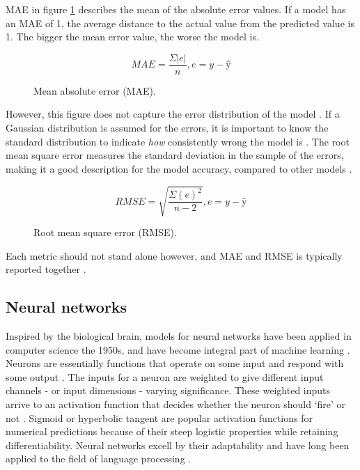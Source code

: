 \documentclass[a4paper]{article}
\begin{document}
MAE in figure \ref{fig:mae} describes the mean of the absolute error values.
If a model has an MAE of 1, the average distance to the actual value from the
predicted value is 1. The bigger the mean error value, the worse the model is.

\begin{figure}
\[MAE = \frac{\Sigma |e|}{n}, e = y - ŷ\]
\caption{Mean absolute error (MAE).}
\label{fig:mae}
\end{figure}

However, this figure does not capture the error distribution of the model
\citep{Chai2014}. If
a Gaussian distribution is assumed for the errors, it is important to know
the standard distribution to indicate \textit{how} consistently wrong the model
is \citep{Agresti2008}. The root mean square error measures the standard
deviation in the sample of the errors, making it a good description for the
model accuracy, compared to other models \citep{Agresti2008, Chai2014}.

\begin{figure}
\[ RMSE = \sqrt{\frac{\Sigma (e)^{2}}{n - 2}}, e = y - ŷ \]
\caption{Root mean square error (RMSE).}
\label{fig:rmse}
\end{figure}

Each metric should not stand alone however, and MAE and RMSE is typically
reported together \citep{Chai2014}.

\subsection{Neural networks}
Inspired by the biological brain, models for neural networks have been applied
in computer science the 1950s, and have become integral part of machine learning
 \citep{NILSSON2009, Russell2009}.
Neurons are essentially functions that operate on some input and respond with
some output \citep{Russell2009}. The inputs for a neuron are weighted to give
different input channels - or input dimensions - varying significance. These
weighted inputs arrive to an activation function that decides whether the
neuron should ‘fire’ or not \citep{NILSSON2009}. Sigmoid or hyperbolic tangent
are popular
activation functions for numerical predictions because of their steep logistic
properties while retaining differentiability. Neural networks excell by their
adaptability and have long been applied to the field of language processing
\citep{Jurafsky2000}.
\end{document}
